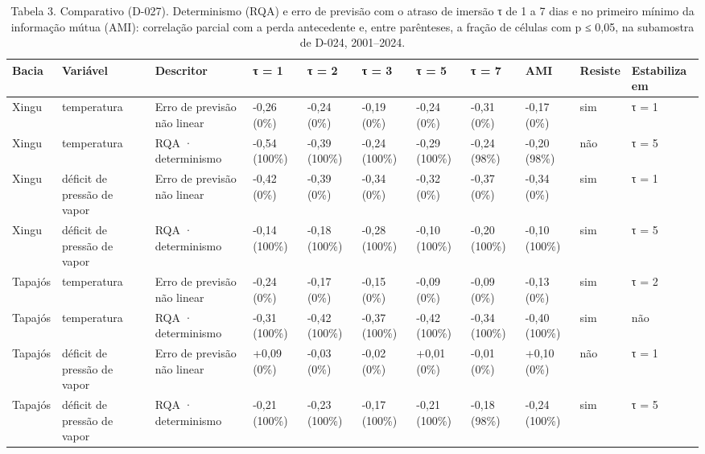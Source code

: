 \begin{table}
\caption{Tabela 3. Comparativo (D-027). Determinismo (RQA) e erro de previsão com o atraso de imersão τ de 1 a 7 dias e no primeiro mínimo da informação mútua (AMI): correlação parcial com a perda antecedente e, entre parênteses, a fração de células com p ≤ 0,05, na subamostra de D-024, 2001–2024.}
\label{tab:07_descritores::atrasos_tau}
\begin{tabular}{lllllllllll}
\toprule
Bacia & Variável & Descritor & τ = 1 & τ = 2 & τ = 3 & τ = 5 & τ = 7 & AMI & Resiste & Estabiliza em \\
\midrule
Xingu & temperatura & Erro de previsão não linear & -0,26 (0\%) & -0,24 (0\%) & -0,19 (0\%) & -0,24 (0\%) & -0,31 (0\%) & -0,17 (0\%) & sim & τ = 1 \\
Xingu & temperatura & RQA · determinismo & -0,54 (100\%) & -0,39 (100\%) & -0,24 (100\%) & -0,29 (100\%) & -0,24 (98\%) & -0,20 (98\%) & não & τ = 5 \\
Xingu & déficit de pressão de vapor & Erro de previsão não linear & -0,42 (0\%) & -0,39 (0\%) & -0,34 (0\%) & -0,32 (0\%) & -0,37 (0\%) & -0,34 (0\%) & sim & τ = 1 \\
Xingu & déficit de pressão de vapor & RQA · determinismo & -0,14 (100\%) & -0,18 (100\%) & -0,28 (100\%) & -0,10 (100\%) & -0,20 (100\%) & -0,10 (100\%) & sim & τ = 5 \\
Tapajós & temperatura & Erro de previsão não linear & -0,24 (0\%) & -0,17 (0\%) & -0,15 (0\%) & -0,09 (0\%) & -0,09 (0\%) & -0,13 (0\%) & sim & τ = 2 \\
Tapajós & temperatura & RQA · determinismo & -0,31 (100\%) & -0,42 (100\%) & -0,37 (100\%) & -0,42 (100\%) & -0,34 (100\%) & -0,40 (100\%) & sim & não \\
Tapajós & déficit de pressão de vapor & Erro de previsão não linear & +0,09 (0\%) & -0,03 (0\%) & -0,02 (0\%) & +0,01 (0\%) & -0,01 (0\%) & +0,10 (0\%) & não & τ = 1 \\
Tapajós & déficit de pressão de vapor & RQA · determinismo & -0,21 (100\%) & -0,23 (100\%) & -0,17 (100\%) & -0,21 (100\%) & -0,18 (98\%) & -0,24 (100\%) & sim & τ = 5 \\
\bottomrule
\end{tabular}
\end{table}
